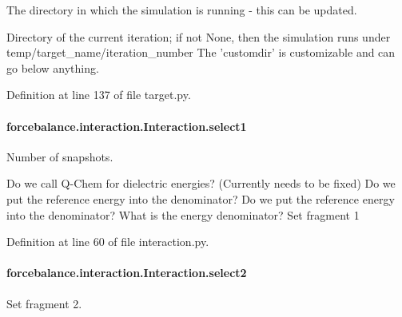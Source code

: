 The directory in which the simulation is running -\/ this can be updated. 

Directory of the current iteration; if not None, then the simulation runs under temp/target\-\_\-name/iteration\-\_\-number The 'customdir' is customizable and can go below anything.

Definition at line 137 of file target.\-py.

\hypertarget{classforcebalance_1_1interaction_1_1Interaction_a22c4a698eb3bf91187894fdce874e8d5}{
\paragraph[{select1}]{\setlength{\rightskip}{0pt plus 5cm}forcebalance.\-interaction.\-Interaction.\-select1\hspace{0.3cm}{\ttfamily [inherited]}}}\label{classforcebalance_1_1interaction_1_1Interaction_a22c4a698eb3bf91187894fdce874e8d5}


Number of snapshots. 

Do we call Q-\/\-Chem for dielectric energies? (Currently needs to be fixed) Do we put the reference energy into the denominator? Do we put the reference energy into the denominator? What is the energy denominator? Set fragment 1 

Definition at line 60 of file interaction.\-py.

\hypertarget{classforcebalance_1_1interaction_1_1Interaction_acbdfffa2596af6c90adf0bfe071d2205}{
\paragraph[{select2}]{\setlength{\rightskip}{0pt plus 5cm}forcebalance.\-interaction.\-Interaction.\-select2\hspace{0.3cm}{\ttfamily [inherited]}}}\label{classforcebalance_1_1interaction_1_1Interaction_acbdfffa2596af6c90adf0bfe071d2205}


Set fragment 2. 



